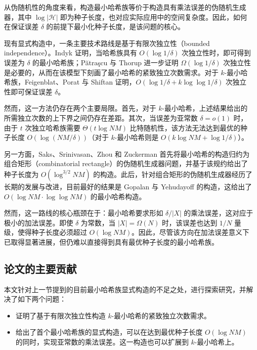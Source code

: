 从伪随机性的角度来看，构造最小哈希族等价于构造具有乘法误差的伪随机生成器，其中 $\log |\mathcal{H}|$ 即为种子长度，也对应实际应用中的空间复杂度。因此，如何在保证误差 $\delta$ 的前提下最小化种子长度，是该问题的核心。

现有显式构造中，一条主要技术路线是基于有限次独立性（bounded independence）。Indyk \cite{minwise_Indyk} 证明，当哈希族具有 $O(\log 1/\delta)$ 次独立性时，即可得到误差为 $\delta$ 的最小哈希族；P{\u{a}}tra{\c{s}}cu 与 Thorup \cite{PT_lb_t_wise_min_wise} 进一步证明 $\Omega(\log 1/\delta)$ 次独立性是必要的，从而在该模型下刻画了最小哈希的紧致独立次数需求。对于 $k$-最小哈希族，Feigenblat、Porat 与 Shiftan \cite{minwise_FPS11} 证明，$O(\log 1/\delta + k \log \log 1/\delta)$ 次独立性即可保证误差 $\delta$。

然而，这一方法仍存在两个主要局限。首先，对于 $k$-最小哈希，上述结果给出的所需独立次数的上下界之间仍存在差距。其次，当误差为亚常数 $\delta = o(1)$ 时，由于 $t$ 次独立哈希族需要 $\Theta(t \log NM)$ 比特随机性，该方法无法达到最优的种子长度 $O(\log (NM / \delta))$（对于 $k$-最小哈希则是 $O(k \log NM + \log 1 / \delta)$）。

另一方面，Saks、Srinivasan、Zhou 和 Zuckerman \cite{SSZZ00_connection_CR_min_wise} 首先将最小哈希的构造归约为组合矩形（combinatorial rectangle）的伪随机生成器问题，并基于该规约给出了种子长度为 $O(\log^{3/2} NM)$ 的构造。此后，针对组合矩形的伪随机生成器经历了长期的发展与改进，目前最好的结果是 Gopalan 与 Yehudayoff \cite{GY20_PRG_CR_SOTA} 的构造，这给出了 $O(\log NM \cdot \log \log NM)$ 的最小哈希构造。

然而，这一路线的核心瓶颈在于：最小哈希要求形如 $\delta/|X|$ 的乘法误差，这对应于极小的加法误差。即使 $\delta$ 为常数，当 $|X| = \Omega(N)$ 时，该误差也达到 $1/N$ 量级，使得种子长度必须超过 $O(\log N M)$。因此，尽管该方向在加法误差意义下已取得显著进展，但仍难以直接得到具有最优种子长度的最小哈希族。

\subsection{论文的主要贡献}

本文针对上一节提到的目前最小哈希族显式构造的不足之处，进行探索研究，并解决了如下两个问题：
\begin{itemize}
    \item 证明了基于有限次独立性构造 $k$-最小哈希的紧致独立次数需求。
    
    \item 给出了首个最小哈希族的显式构造，可以在达到最优种子长度 $O(\log N M)$ 的同时，实现亚常数的乘法误差。这一构造也可以扩展到 $k$-最小哈希上。
\end{itemize}

